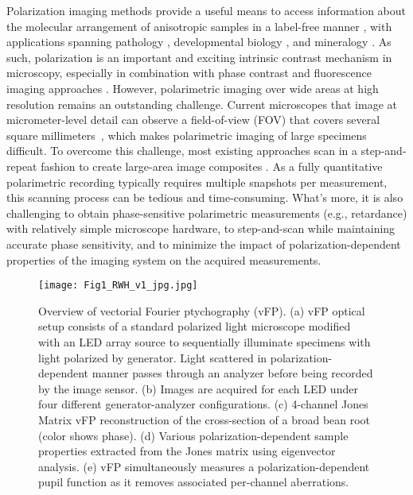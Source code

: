 \documentclass{article}
\begin{document}
\label{sec:intro}
Polarization imaging methods provide a useful means to access information about the molecular arrangement of anisotropic samples in a label-free manner \cite{chipman2018polarized}, with applications spanning pathology \cite{pathpol,jin2003imaging,manjunatha2015histopathological,he2015characterizing,zhang2016wide,jan2015polarization,badreddine2016real,he2021polarisation}, developmental biology \cite{biopol}, and mineralogy \cite{panwar2020review}. As such, polarization is an important and exciting intrinsic contrast mechanism in microscopy, especially in combination with phase contrast and fluorescence imaging approaches \cite{guo2020revealing}. However, polarimetric imaging over wide areas at high resolution remains an outstanding challenge. Current microscopes that image at micrometer-level detail can observe a field-of-view (FOV) that covers several square millimeters~\cite{Zheng:14}, which makes polarimetric imaging of large specimens difficult. To overcome this challenge, most existing approaches scan in a step-and-repeat fashion to create large-area image composites \cite{jan2017collagen}. As a fully quantitative polarimetric recording typically requires multiple snapshots per measurement, this scanning process can be tedious and time-consuming. What’s more, it is also challenging to obtain phase-sensitive polarimetric measurements (e.g., retardance) with relatively simple microscope hardware, to step-and-scan while maintaining accurate phase sensitivity, and to minimize the impact of polarization-dependent properties of the imaging system on the acquired measurements.


\begin{figure*}[t!]
\begin{center}
  \texttt{[image: Fig1\_RWH\_v1\_jpg.jpg]} 
   \caption{Overview of vectorial Fourier ptychography (vFP). (a) vFP optical setup consists of a standard polarized light microscope modified with an LED array source to sequentially illuminate specimens with light polarized by generator. Light scattered in polarization-dependent manner passes through an analyzer before being recorded by the image sensor. (b) Images are acquired for each LED under four different generator-analyzer configurations. (c) 4-channel Jones Matrix vFP reconstruction of the cross-section of a broad bean root (color shows phase). (d) Various polarization-dependent sample properties extracted from the Jones matrix using eigenvector analysis. (e) vFP simultaneously measures a polarization-dependent pupil function as it removes associated per-channel aberrations. }
\label{teaser_fig}
\end{center}
\end{figure*}
\end{document}
